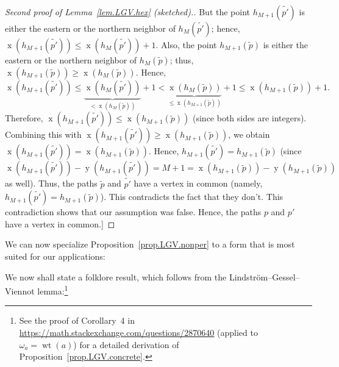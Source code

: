 \documentclass[reqno]{amsart}
\newcommand{\0}{\phantom{c}}
\DeclareMathOperator{\wt}{wt} %
\DeclareMathOperator{\xcoord}{x} %
\DeclareMathOperator{\ycoord}{y} %
\newenvironment{verlong}{}{}
\theoremstyle{plain}
\theoremstyle{definition}
\numberwithin{equation}{section}
\begin{document}
\begin{verlong}
\begin{proof}[Second proof of Lemma~\ref{lem.LGV.hex} (sketched).]
But the point $h_{M+1}\left(  \widetilde{p'}\right)  $ is either the
eastern or the northern neighbor of
$h_{M}\left(  \widetilde{p'}\right)  $; hence,
$\xcoord\left(  h_{M+1}\left(
\widetilde{p'}\right)  \right)  \leq\xcoord\left(
h_{M}\left(  \widetilde{p'}\right)  \right)  +1$. Also, the point
$h_{M+1}\left(  \widetilde{p}\right)  $ is either the eastern or the northern
neighbor of $h_{M}\left(  \widetilde{p}\right)  $; thus, $\xcoord%
\left(  h_{M+1}\left(  \widetilde{p}\right)  \right)  \geq\xcoord%
\left(  h_{M}\left(  \widetilde{p}\right)  \right)  $. Hence,
\[
\xcoord\left(  h_{M+1}\left(  \widetilde{p'}\right)
\right)  \leq\underbrace{\xcoord\left(  h_{M}\left(
\widetilde{p'}\right)  \right)  }_{<\xcoord\left(
h_{M}\left(  \widetilde{p}\right)  \right)  }+1<\underbrace{\xcoord%
\left(  h_{M}\left(  \widetilde{p}\right)  \right)  }_{\leq\xcoord%
\left(  h_{M+1}\left(  \widetilde{p}\right)  \right)  }+1\leq\xcoord%
\left(  h_{M+1}\left(  \widetilde{p}\right)  \right)  +1.
\]
Therefore, $\xcoord\left(  h_{M+1}\left(  \widetilde{p'%
}\right)  \right)  \leq\xcoord\left(  h_{M+1}\left(  \widetilde{p}%
\right)  \right)  $ (since both sides are integers). Combining this with
$\xcoord\left(  h_{M+1}\left(  \widetilde{p'}\right)
\right)  \geq\xcoord\left(  h_{M+1}\left(  \widetilde{p}\right)
\right)  $, we obtain $\xcoord\left(  h_{M+1}\left(
\widetilde{p'}\right)  \right)  =\xcoord\left(
h_{M+1}\left(  \widetilde{p}\right)  \right)  $. Hence, $h_{M+1}\left(
\widetilde{p'}\right)  =h_{M+1}\left(  \widetilde{p}\right)  $ (since
$\xcoord\left(  h_{M+1}\left(  \widetilde{p'}\right)
\right)  -\ycoord\left(  h_{M+1}\left(  \widetilde{p'%
}\right)  \right)  =M+1=\xcoord\left(  h_{M+1}\left(  \widetilde{p}%
\right)  \right)  -\ycoord\left(  h_{M+1}\left(  \widetilde{p}%
\right)  \right)  $ as well). Thus, the paths $\widetilde{p}$ and
$\widetilde{p'}$ have a vertex in common (namely, $h_{M+1}\left(
\widetilde{p'}\right)  =h_{M+1}\left(  \widetilde{p}\right)  $). This
contradicts the fact that they don't. This contradiction shows that our
assumption was false. Hence, the paths $p$ and $p'$ have a vertex in common.]
\end{proof}

We can now specialize Proposition~\ref{prop.LGV.nonper} to a form that is most
suited for our applications:
\end{verlong}

We now shall state a folklore result, which follows from the Lindstr\"om--Gessel--Viennot lemma:\footnote{%
See the proof of Corollary~4 in \url{https://math.stackexchange.com/questions/2870640} (applied to $\omega_{a} = \wt(a)$) for a detailed derivation of Proposition~\ref{prop.LGV.concrete}.}
\end{document}
